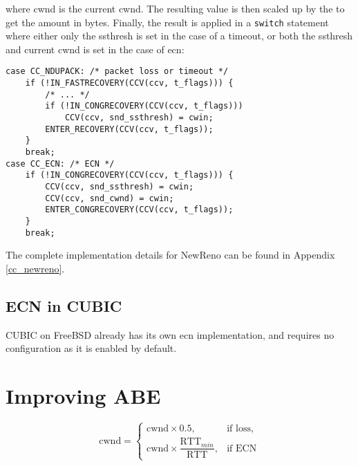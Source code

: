 where cwnd is the current \gls{cwnd}. The resulting value is then scaled up by the  to get the amount in bytes. Finally, the result is applied in a \lstinline{switch} statement where either only the \gls{ssthresh} is set in the case of a timeout, or both the \gls{ssthresh} and current \gls{cwnd} is set in the case of \gls{ecn}:

\begin{verbatim}
case CC_NDUPACK: /* packet loss or timeout */
    if (!IN_FASTRECOVERY(CCV(ccv, t_flags))) {
        /* ... */
        if (!IN_CONGRECOVERY(CCV(ccv, t_flags)))
            CCV(ccv, snd_ssthresh) = cwin;
        ENTER_RECOVERY(CCV(ccv, t_flags));
    }
    break;
case CC_ECN: /* ECN */
    if (!IN_CONGRECOVERY(CCV(ccv, t_flags))) {
        CCV(ccv, snd_ssthresh) = cwin;
        CCV(ccv, snd_cwnd) = cwin;
        ENTER_CONGRECOVERY(CCV(ccv, t_flags));
    }
    break;
\end{verbatim}
The complete implementation details for NewReno can be found in Appendix \ref{cc_newreno}.


\subsection{ECN in CUBIC}

CUBIC on FreeBSD already has its own \gls{ecn} implementation, and requires no configuration as it is enabled by default.










\section{Improving ABE}



\begin{equation} \label{eq:cwnd_improved_abe}
    \mathrm{cwnd} = \begin{cases}
        \mathrm{cwnd} \times 0.5, & \text{if loss},\\
        \mathrm{cwnd} \times \dfrac{\mathrm{RTT}_{min}}{\mathrm{RTT}}, & \text{if ECN}
    \end{cases}
\end{equation}

